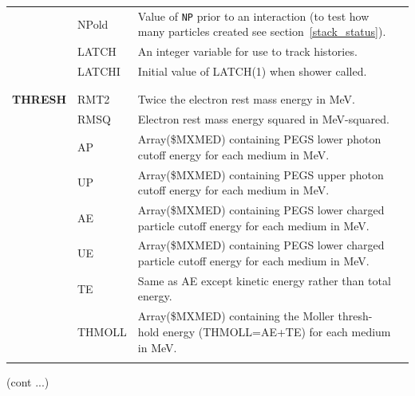 \begin{table}[htb]
\begin{center}
\begin{tabular}{ l  l   p{105mm}l  |}
	&NPold	& Value of {\tt NP} prior to an interaction (to test how many
		particles created see section~\ref{stack_status}).\\

	&LATCH	&An integer variable for use to track histories.\\

	&LATCHI	&Initial value of LATCH(1) when shower called.\\
&&\\
\hline
&&\\
{\bfseries THRESH}	&RMT2	&Twice the electron rest mass
                            energy in MeV.\\
	&RMSQ	& Electron rest mass energy squared
                            in MeV-squared.\\
	&AP	&Array(\$MXMED) containing PEGS lower photon
                            cutoff energy for each medium in
                            MeV.\\
	&UP	& Array(\$MXMED) containing PEGS upper photon
                            cutoff energy for each medium in
                            MeV.\\
	&AE	&Array(\$MXMED) containing PEGS lower charged
                            particle cutoff energy for each
                            medium in MeV.\\
	&UE	&Array(\$MXMED) containing PEGS lower charged
                            particle cutoff energy for each
                            medium in MeV.\\
	&TE	&Same as AE except kinetic energy
                            rather than total energy.\\
	&THMOLL	&Array(\$MXMED) containing the Moller thresh-
                            hold energy (THMOLL=AE+TE) for
                            each medium in MeV.\\
&&\\
\hline
    \end{tabular}
    \end{center}
    \mbox{}\hfill (cont ...)\\
    \end{table}
    \clearpage

